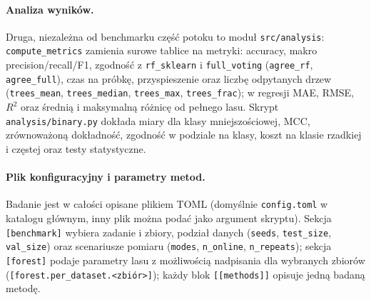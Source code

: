 \documentclass{article}
\newcommand{\code}[1]{\texttt{#1}}
\begin{document}
\paragraph{Analiza wyników.}
Druga, niezależna od benchmarku część potoku to moduł \code{src/analysis}:
\code{compute\_metrics} zamienia surowe tablice na metryki: accuracy, makro
precision/recall/F1, zgodność z \code{rf\_sklearn} i \code{full\_voting}
(\code{agree\_rf}, \code{agree\_full}), czas na próbkę, przyspieszenie oraz liczbę
odpytanych drzew (\code{trees\_mean}, \code{trees\_median}, \code{trees\_max},
\code{trees\_frac}); w regresji MAE, RMSE, $R^2$ oraz średnią i maksymalną różnicę od
pełnego lasu. Skrypt \code{analysis/binary.py} dokłada miary dla klasy mniejszościowej,
MCC, zrównoważoną dokładność, zgodność w podziale na klasy, koszt na klasie rzadkiej
i częstej oraz testy statystyczne.

\paragraph{Plik konfiguracyjny i parametry metod.}
Badanie jest w całości opisane plikiem TOML (domyślnie \code{config.toml} w katalogu głównym,
inny plik można podać jako argument skryptu). Sekcja \code{[benchmark]} wybiera zadanie
i zbiory, podział danych (\code{seeds}, \code{test\_size}, \code{val\_size}) oraz
scenariusze pomiaru (\code{modes}, \code{n\_online}, \code{n\_repeats}); sekcja
\code{[forest]} podaje parametry lasu z możliwością nadpisania dla wybranych zbiorów
(\code{[forest.per\_dataset.<zbiór>]}); każdy blok \code{[[methods]]} opisuje jedną badaną
metodę.
\end{document}
